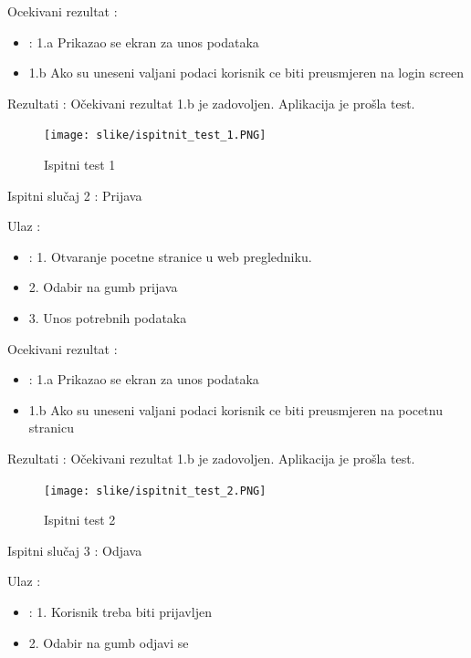			\noindent Ocekivani rezultat : 

			\begin{itemize}
				\item : 1.a Prikazao se ekran za unos podataka
				\item   1.b Ako su uneseni valjani podaci korisnik ce biti preusmjeren na login screen
			\end{itemize}
	
			\noindent Rezultati : Očekivani rezultat 1.b je zadovoljen. Aplikacija je prošla test. 

			\begin{figure}[H]
				\texttt{[image: slike/ispitnit\_test\_1.PNG]} %
				\caption{Ispitni test 1}
				\label{fig:Test1} %
			\end{figure}
			
			\noindent Ispitni slučaj 2 : Prijava

			\noindent Ulaz : 
	
			\begin{itemize}
				\item : 1. Otvaranje pocetne stranice u web pregledniku.
				\item   2. Odabir na gumb prijava
				\item   3. Unos potrebnih podataka
			\end{itemize}

			\noindent Ocekivani rezultat : 

			\begin{itemize}
				\item : 1.a Prikazao se ekran za unos podataka
				\item   1.b Ako su uneseni valjani podaci korisnik ce biti preusmjeren na pocetnu stranicu
			\end{itemize}
	
			\noindent Rezultati : Očekivani rezultat 1.b je zadovoljen. Aplikacija je prošla test. 

			\begin{figure}[H]
				\texttt{[image: slike/ispitnit\_test\_2.PNG]} %
				\caption{Ispitni test 2}
				\label{fig:Test2} %
			\end{figure}			

			\noindent Ispitni slučaj 3 : Odjava

			\noindent Ulaz : 
	
			\begin{itemize}
				\item : 1. Korisnik treba biti prijavljen
				\item   2. Odabir na gumb odjavi se
			\end{itemize}

